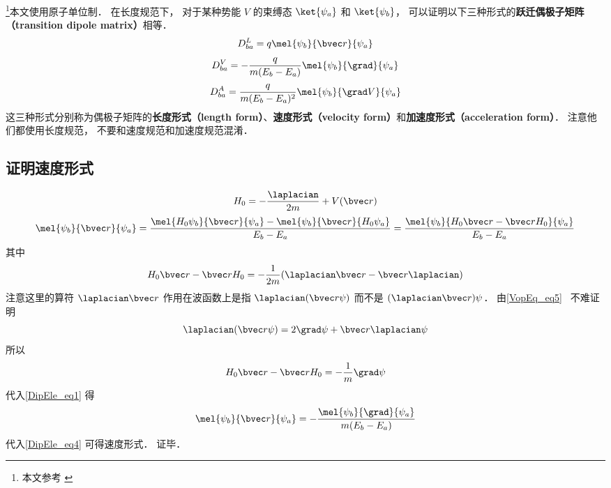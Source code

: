 

\footnote{本文参考 \cite{Bransden}}本文使用原子单位制． 在长度规范下， 对于某种势能 $V$ 的束缚态 $\ket{\psi_a}$ 和 $\ket{\psi_b}$， 可以证明以下三种形式的\textbf{跃迁偶极子矩阵（transition dipole matrix）}相等．
\begin{equation}\label{DipEle_eq4}
D_{ba}^L = q\mel{\psi_b}{\bvec r}{\psi_a}
\end{equation}
\begin{equation}\label{DipEle_eq3}
D_{ba}^V = -\frac{q}{m(E_b - E_a)}\mel{\psi_b}{\grad}{\psi_a}
\end{equation}
\begin{equation}
D_{ba}^A = \frac{q}{m(E_b-E_a)^2} \mel{\psi_b}{\grad V}{\psi_a}
\end{equation}
这三种形式分别称为偶极子矩阵的\textbf{长度形式（length form）}、\textbf{速度形式（velocity form）}和\textbf{加速度形式（acceleration form）}． 注意他们都使用长度规范， 不要和速度规范和加速度规范混淆． %

\subsection{证明速度形式}
\begin{equation}
H_0 = -\frac{\laplacian}{2m} + V(\bvec r)
\end{equation}
\begin{equation}\label{DipEle_eq1}
\mel{\psi_b}{\bvec r}{\psi_a} = \frac{\mel{H_0\psi_b}{\bvec r}{\psi_a} - \mel{\psi_b}{\bvec r}{H_0\psi_a}}{E_b - E_a} = \frac{\mel{\psi_b}{H_0\bvec r - \bvec rH_0}{\psi_a}}{E_b - E_a}
\end{equation}
其中
\begin{equation}
H_0\bvec r - \bvec rH_0 = -\frac{1}{2m}(\laplacian \bvec r - \bvec r \laplacian)
\end{equation}
注意这里的算符 $\laplacian \bvec r$ 作用在波函数上是指 $\laplacian (\bvec r \psi)$ 而不是 $(\laplacian \bvec r) \psi$． 由\autoref{VopEq_eq5}~ 不难证明
\begin{equation}
\laplacian (\bvec r \psi) = 2 \grad \psi + \bvec r \laplacian \psi
\end{equation}
所以
\begin{equation}
H_0\bvec r - \bvec rH_0 = -\frac{1}{m}\grad \psi
\end{equation}
代入\autoref{DipEle_eq1} 得
\begin{equation}
\mel{\psi_b}{\bvec r}{\psi_a} = -\frac{\mel{\psi_b}{\grad}{\psi_a}}{m(E_b - E_a)}
\end{equation}
代入\autoref{DipEle_eq4} 可得速度形式． 证毕．


